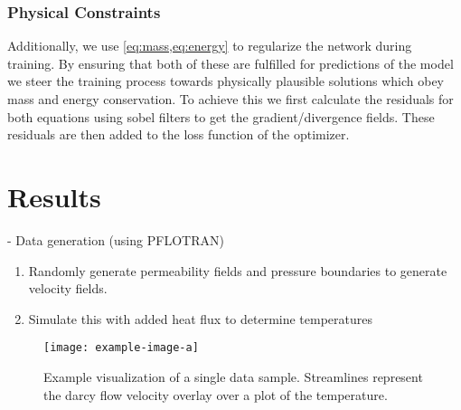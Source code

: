 \documentclass{article} %
\begin{document}




\subsubsection*{Physical Constraints}
Additionally, we use \cref{eq:mass,eq:energy} to regularize the network during training.
By ensuring that both of these are fulfilled for predictions of the model we steer the training process towards physically plausible solutions which obey mass and energy conservation.
To achieve this we first calculate the residuals for both equations using sobel filters to get the gradient/divergence fields.
These residuals are then added to the loss function of the optimizer.




\section{Results}
\label{sec:results}


- Data generation (using PFLOTRAN)
\begin{enumerate}
\item Randomly generate permeability fields and pressure boundaries to generate velocity fields.
\item Simulate this with added heat flux to determine temperatures
\end{enumerate}

\begin{figure}[htb]
   \centering
   \texttt{[image: example-image-a]}
   \caption{Example visualization of a single data sample. Streamlines represent the darcy flow velocity overlay over a plot of the temperature.}
\end{figure}

\end{document}
